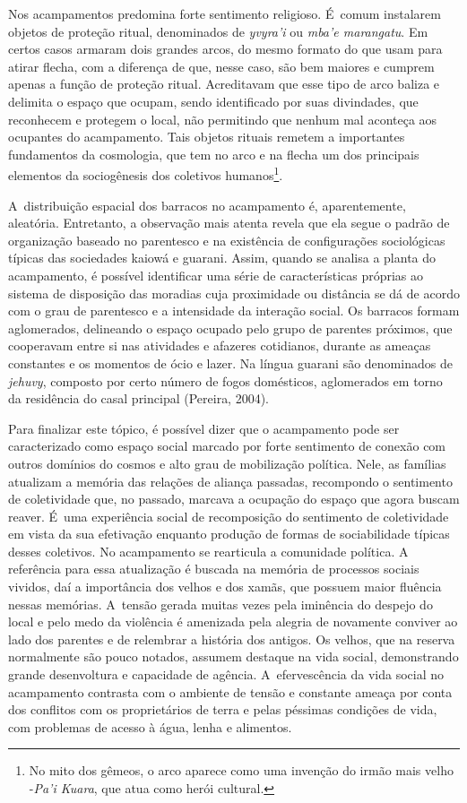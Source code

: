 Nos acampamentos predomina forte sentimento religioso. É~comum
instalarem objetos de proteção ritual, denominados de \emph{yvyra’i} ou \emph{mba’e
marangatu}. Em certos casos armaram dois grandes arcos, do mesmo formato
do que usam para atirar flecha, com a diferença de que, nesse caso, são
bem maiores e cumprem apenas a função de proteção ritual. Acreditavam
que esse tipo de arco baliza e delimita o espaço que ocupam, sendo
identificado por suas divindades, que reconhecem e protegem o local,
não permitindo que nenhum mal aconteça aos ocupantes do acampamento.
Tais objetos rituais remetem a importantes fundamentos da cosmologia,
que tem no arco e na flecha um dos principais elementos da sociogênesis
dos coletivos humanos\footnote{No mito dos gêmeos, o arco aparece como
uma invenção do irmão mais velho -\emph{Pa’i Kuara}, que atua como herói
cultural.}.

A~distribuição espacial dos barracos no acampamento é, aparentemente,
aleatória. Entretanto, a observação mais atenta revela que ela segue o
padrão de organização baseado no parentesco e na existência de
configurações sociológicas típicas das sociedades kaiowá e guarani.
Assim, quando se analisa a planta do acampamento, é possível
identificar uma série de características próprias ao sistema de
disposição das moradias cuja proximidade ou distância se dá de acordo
com o grau de parentesco e a intensidade da interação social. Os
barracos formam aglomerados, delineando o espaço ocupado pelo grupo de
parentes próximos, que cooperavam entre si nas atividades e afazeres
cotidianos, durante as ameaças constantes e os momentos de ócio e
lazer. Na língua guarani são denominados de \emph{jehuvy}, composto por certo
número de fogos domésticos, aglomerados em torno da residência do casal
principal (Pereira, 2004).

Para finalizar este tópico, é possível dizer que o acampamento pode ser
caracterizado como espaço social marcado por forte sentimento de
conexão com outros domínios do cosmos e alto grau de mobilização
política. Nele, as famílias atualizam a memória das relações de aliança
passadas, recompondo o sentimento de coletividade que, no passado,
marcava a ocupação do espaço que agora buscam reaver. É~uma experiência
social de recomposição do sentimento de coletividade em vista da sua
efetivação enquanto produção de formas de sociabilidade típicas desses
coletivos. No acampamento se rearticula a comunidade política. A
referência para essa atualização é buscada na memória de processos
sociais vividos, daí a importância dos velhos e dos xamãs, que possuem
maior fluência nessas memórias. A~tensão gerada muitas vezes pela
iminência do despejo do local e pelo medo da violência é amenizada pela
alegria de novamente conviver ao lado dos parentes e de relembrar a
história dos antigos. Os velhos, que na reserva normalmente são pouco
notados, assumem destaque na vida social, demonstrando grande
desenvoltura e capacidade de agência. A~efervescência da vida social no
acampamento contrasta com o ambiente de tensão e constante ameaça por
conta dos conflitos com os proprietários de terra e pelas péssimas
condições de vida, com problemas de acesso à água, lenha e alimentos. 

